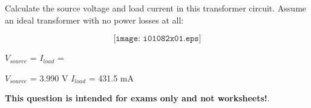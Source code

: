 

Calculate the source voltage and load current in this transformer circuit.  Assume an ideal transformer with no power losses at all:

$$\texttt{[image: i01082x01.eps]}$$

$V_{source}$ = \hskip 80pt $I_{load}$ =

\vskip 10pt







$V_{source}$ = 3.990 V \hskip 80pt $I_{load}$ = 431.5 mA







{\bf This question is intended for exams only and not worksheets!}.



